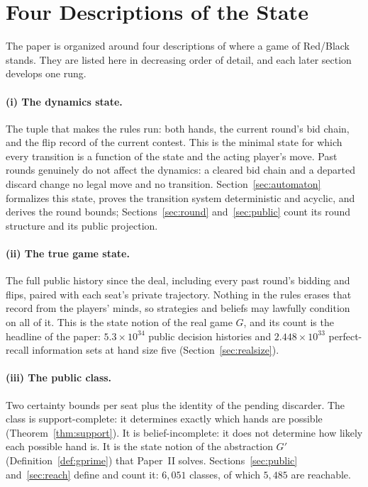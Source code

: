 \documentclass[11pt]{article}
\theoremstyle{plain}
\theoremstyle{definition}
\theoremstyle{remark}
\begin{document}
\section{Four Descriptions of the State}\label{sec:ladder}

The paper is organized around four descriptions of where a game of
Red/Black stands. They are listed here in decreasing order of detail, and
each later section develops one rung.

\paragraph{(i) The dynamics state.} The tuple that makes the rules run:
both hands, the current round's bid chain, and the flip record of the
current contest. This is the minimal state for which every transition is a
function of the state and the acting player's move. Past rounds genuinely
do not affect the dynamics: a cleared bid chain and a departed discard
change no legal move and no transition.
Section~\ref{sec:automaton} formalizes this state, proves the transition
system deterministic and acyclic, and derives the round bounds;
Sections~\ref{sec:round} and~\ref{sec:public} count its round structure
and its public projection.

\paragraph{(ii) The true game state.} The full public history since the
deal, including every past round's bidding and flips, paired with each
seat's private trajectory. Nothing in the rules erases that record from the
players' minds, so strategies and beliefs may lawfully condition on all of
it. This is the state notion of the real game $G$, and its count is the
headline of the paper: $5.3\times10^{34}$ public decision histories and
$2.448\times10^{33}$ perfect-recall information sets at hand size five
(Section~\ref{sec:realsize}).

\paragraph{(iii) The public class.} Two certainty bounds per seat plus the
identity of the pending discarder. The class is support-complete: it
determines exactly which hands are possible (Theorem~\ref{thm:support}).
It is belief-incomplete: it does not determine how likely each possible
hand is. It is the state notion of the abstraction $G'$
(Definition~\ref{def:gprime}) that Paper~II solves.
Sections~\ref{sec:public} and~\ref{sec:reach} define and count it:
$6{,}051$ classes, of which $5{,}485$ are reachable.
\end{document}
